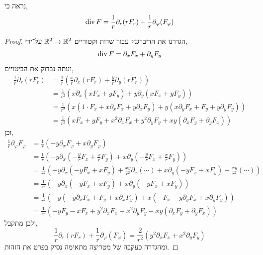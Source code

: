 \subquestion{}
נראה כי,
\[
	\operatorname{div} F
	= \frac{1}{r} \partial_r(r F_r) + \frac{1}{r} \partial_\varphi(F_\varphi)
\]
\begin{proof}
	הגדרנו את הדיברגנץ עבור שדות וקטוריים $\mathbb{R}^2 \to \mathbb{R}^2$ על־ידי,
	\[
		\operatorname{div} F
		= \partial_x F_x + \partial_y F_y
	\]
	ועתה נבדוק את הביטויים,
	\begin{align*}
		\frac{1}{r} \partial_r(r F_r)
		& = \frac{1}{r} (\frac{x}{r} \partial_x (r F_r) + \frac{y}{r} \partial_y (r F_r)) \\
		& = \frac{1}{r^2} (x \partial_x (x F_x + y F_y) + y \partial_y (x F_x + y F_y)) \\
		& = \frac{1}{r^2} (x (1 \cdot F_x + x \partial_x F_x + y \partial_x F_y) + y (x \partial_y F_x + F_y + y \partial_y F_y)) \\
		& = \frac{1}{r^2} (x F_x + y F_y + x^2 \partial_x F_x + y^2 \partial_y F_y + xy (\partial_x F_y + \partial_y F_x))
	\end{align*}
	וכן,
	\begin{align*}
		\frac{1}{r} \partial_\varphi F_\varphi
		& = \frac{1}{r} (-y \partial_x F_\varphi + x \partial_y F_\varphi) \\
		& = \frac{1}{r} (-y \partial_x (- \frac{y}{r} F_x + \frac{x}{r} F_y) + x \partial_y (- \frac{y}{r} F_x + \frac{x}{r} F_y)) \\
		& = \frac{1}{r^2} (-y \partial_x (- y F_x + x F_y) + \frac{x y}{r^2} \partial_x(\cdots) + x \partial_y (- y F_x + x F_y) - \frac{x y}{r^2}(\cdots)) \\
		& = \frac{1}{r^2} (-y \partial_x (- y F_x + x F_y) + x \partial_y (- y F_x + x F_y)) \\
		& = \frac{1}{r^2} (-y (-y \partial_x F_x + F_y + x \partial_x F_y) + x (- F_x - y \partial_y F_x + x \partial_y F_y) ) \\
		& = \frac{1}{r^2} (-y F_y - x F_x + y^2 \partial_x F_x + x^2 \partial_y F_y - x y (\partial_x F_y + \partial_y F_x))
	\end{align*}
	ולכן מתקבל,
	\[
		\frac{1}{r} \partial_r(r F_r) + \frac{1}{r} \partial_\varphi(F_\varphi)
		= \frac{2}{r^2} (y^2 \partial_x F_x + x^2 \partial_y F_y)
	\]
	ומהגדרה כעקבה של מטריצה מתאימה נסיק בפרט את הזהות.
\end{proof}


